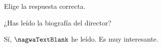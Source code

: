 
\begin{question}

\begin{instance}
  
\begin{mcq}[standalone=false]
    
\begin{stem}
      Elige la respuesta correcta.\par      
\begin{enumerationnolabel}
        \item{¿Has leído la biografía del director?        }        
        \item{Sí, $\nagwaTextBlank$ he leído. Es muy interesante.        }      
\end{enumerationnolabel}
    
\end{stem}
    
\begin{distractors}
\end{distractors}
              
\end{mcq}

\end{instance}

\end{question}
